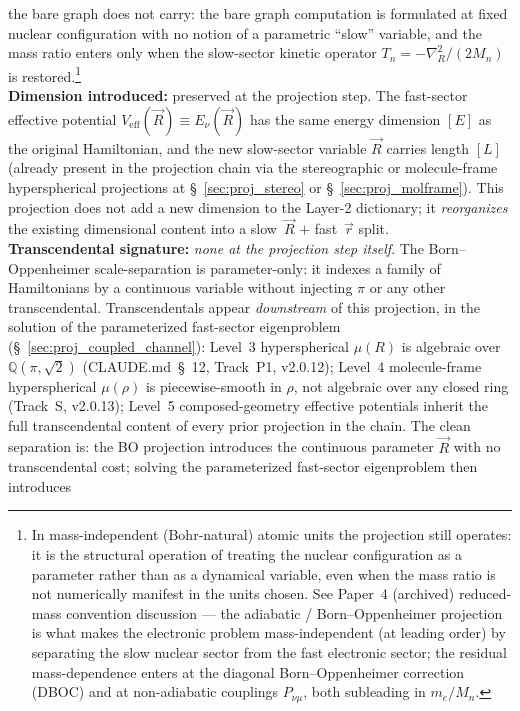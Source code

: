 \documentclass[11pt]{article}
\begin{document}
the bare graph does not carry: the bare graph computation is
formulated at fixed nuclear configuration with no notion of a
parametric ``slow'' variable, and the mass ratio enters only when
the slow-sector kinetic operator $T_n = -\nabla_R^2 / (2 M_n)$ is
restored.\footnote{In mass-independent (Bohr-natural) atomic units
the projection still operates: it is the structural operation of
treating the nuclear configuration as a parameter rather than as a
dynamical variable, even when the mass ratio is not numerically
manifest in the units chosen.  See Paper~4 (archived) reduced-mass
convention discussion --- the adiabatic / Born--Oppenheimer
projection is what makes the electronic problem mass-independent
(at leading order) by separating the slow nuclear sector from the
fast electronic sector; the residual mass-dependence enters at the
diagonal Born--Oppenheimer correction (DBOC) and at non-adiabatic
couplings $P_{\nu\mu}$, both subleading in $m_e / M_n$.}\\
\textbf{Dimension introduced:} preserved at the projection step.  The
fast-sector effective potential $V_\text{eff}(\vec{R}) \equiv
E_\nu(\vec{R})$ has the same energy dimension $[E]$ as the original
Hamiltonian, and the new slow-sector variable $\vec{R}$ carries length
$[L]$ (already present in the projection chain via the stereographic
or molecule-frame hyperspherical projections at \S~\ref{sec:proj_stereo}
or \S~\ref{sec:proj_molframe}).  This projection does
not add a new dimension to the Layer-2 dictionary; it
\emph{reorganizes} the existing dimensional content into a slow~$\vec{R}$
$+$ fast~$\vec{r}$ split.\\
\textbf{Transcendental signature:} \textit{none at the projection step
itself}.  The Born--Oppenheimer scale-separation is parameter-only:
it indexes a family of Hamiltonians by a continuous variable without
injecting $\pi$ or any other transcendental.  Transcendentals appear
\emph{downstream} of this projection, in the solution of the
parameterized fast-sector eigenproblem
(\S~\ref{sec:proj_coupled_channel}): Level~3 hyperspherical $\mu(R)$
is
algebraic over $\mathbb{Q}(\pi, \sqrt{2})$ (CLAUDE.md~\S~12, Track~P1,
v2.0.12); Level~4 molecule-frame hyperspherical $\mu(\rho)$ is
piecewise-smooth in $\rho$, not algebraic over any closed ring
(Track~S, v2.0.13); Level~5 composed-geometry effective potentials
inherit the full transcendental content of every prior projection in
the chain.  The clean separation is: the BO projection introduces the
continuous parameter $\vec{R}$ with no transcendental cost; solving
the parameterized fast-sector eigenproblem then introduces
\end{document}
